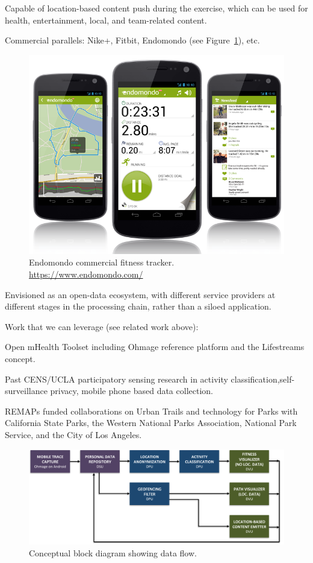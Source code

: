 Capable of location-based content push during the exercise, which can be used for health, entertainment, local, and team-related content. 

Commercial parallels:  Nike+, Fitbit, Endomondo (see Figure~\ref{fig:endomondo}), etc. 

\begin{figure}
\begin{center}
\includegraphics[width=.6\textwidth]{figures/endomondo}
\caption{Endomondo commercial fitness tracker. \protect\url{https://www.endomondo.com/}}
\label{fig:endomondo}
\end{center}
\end{figure}


Envisioned as an open-data ecosystem, with different service providers at different stages in the processing chain, rather than a siloed application.

Work that we can leverage (see related work above): 

Open mHealth Toolset  including Ohmage reference platform and the Lifestreams concept. 

Past CENS/UCLA participatory sensing research in activity classification,self-surveillance privacy, mobile phone based data collection.

REMAPs funded collaborations on Urban Trails and technology for Parks with California State Parks, the Western National Parks Association, National Park Service, and the City of Los Angeles. 

\begin{figure}
\begin{center}
\includegraphics[width=1\textwidth]{figures/ConceptualBlock}
\caption{Conceptual block diagram showing data flow.}
\label{fig:ConceptualBlock}
\end{center}
\end{figure}


